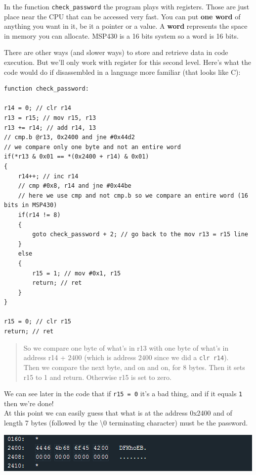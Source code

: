 \documentclass[a4paper,11pt]{article}
\begin{document}
In the function \texttt{check\_password} the program plays with
registers. Those are just place near the CPU that can be accessed very
fast. You can put \textbf{one word} of anything you want in it, be it a
pointer or a value. A \textbf{word} represents the space in memory you
can allocate. MSP430 is a 16 bits system so a word is 16 bits.

There are other ways (and slower ways) to store and retrieve data in
code execution. But we'll only work with register for this second level.
Here's what the code would do if disassembled in a language more
familiar (that looks like C):

\begin{verbatim}
function check_password:

r14 = 0; // clr r14
r13 = r15; // mov r15, r13
r13 += r14; // add r14, 13
// cmp.b @r13, 0x2400 and jne #0x44d2
// we compare only one byte and not an entire word
if(*r13 & 0x01 == *(0x2400 + r14) & 0x01)
{
    r14++; // inc r14
    // cmp #0x8, r14 and jne #0x44be
    // here we use cmp and not cmp.b so we compare an entire word (16 bits in MSP430)
    if(r14 != 8)
    { 
        goto check_password + 2; // go back to the mov r13 = r15 line
    }
    else
    {
        r15 = 1; // mov #0x1, r15
        return; // ret
    }
}

r15 = 0; // clr r15
return; // ret
\end{verbatim}

\begin{quote}
So we compare one byte of what's in r13 with one byte of what's in
address r14 + 2400 (which is address 2400 since we did a
\texttt{clr r14}).\\Then we compare the next byte, and on and on, for 8
bytes. Then it sets r15 to 1 and return. Otherwise r15 is set to zero.
\end{quote}

We can see later in the code that if \texttt{r15 = 0} it's a bad thing,
and if it equals \texttt{1} then we're done!\\At this point we can
easily guess that what is at the address 0x2400 and of length 7 bytes
(followed by the \textbackslash{}0 terminating character) must be the
password.

\includegraphics{img/1_6.png}
\end{document}
